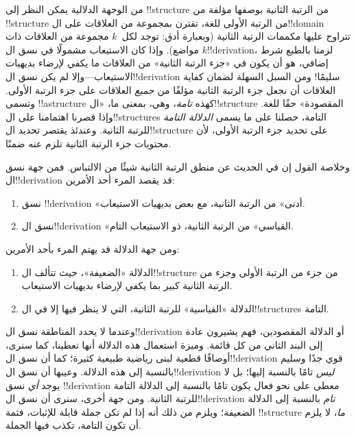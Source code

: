 \documentclass[../../../include/open-logic-section]{subfiles}
\begin{document}
من الوجهة الدلالية يمكن النظر إلى !!{structure} من الرتبة الثانية
بوصفها مؤلفة من !!{structure} من الرتبة الأولى للغة، تقترن بمجموعة من
العلاقات على ال!!{domain} تتراوح عليها مكممات الرتبة الثانية (وبعبارة
  أدق: توجد لكل~$k$ مجموعة من العلاقات ذات $k$ مواضع). وإذا كان
الاستيعاب مشمولًا في نسق ال!!{derivation}، لزمنا بالطبع شرط إضافي، هو
أن يكون في «جزء الرتبة الثانية» من العلاقات ما يكفي لإرضاء بديهيات
الاستيعاب---وإلا لم يكن نسق ال!!{derivation} سليمًا!{} ومن السبل السهلة
لضمان كفاية العلاقات أن نجعل جزء الرتبة الثانية مؤلفًا من
\emph{جميع} العلاقات على جزء الرتبة الأولى. وتسمى !!a{structure} كهذه
\emph{تامة}، وهي، بمعنى ما، «ال!!{structure} المقصودة» حقًا للغة.
وإذا قصرنا اهتمامنا على ال!!{structure}s التامة، حصلنا على ما يسمى
\emph{الدلالة التامة} للرتبة الثانية. وعندئذ يقتصر تحديد
ال!!{structure} على تحديد جزء الرتبة الأولى، لأن محتويات جزء الرتبة
الثانية تلزم عنه ضمنًا.

وخلاصة القول إن في الحديث عن منطق الرتبة الثانية شيئًا من الالتباس.
فمن جهة نسق ال!!{derivation} قد يقصد المرء أحد الأمرين:
\begin{enumerate}
\item نسق !!{derivation} «أدنى» من الرتبة الثانية، مع بعض بديهيات
  الاستيعاب.
\item نسق ال!!{derivation} «القياسي» من الرتبة الثانية، ذو الاستيعاب
  التام.
\end{enumerate}
ومن جهة الدلالة قد يهتم المرء بأحد الأمرين:
\begin{enumerate}
\item الدلالة «الضعيفة»، حيث تتألف ال!!{structure} من جزء من الرتبة
  الأولى وجزء من الرتبة الثانية كبير بما يكفي لإرضاء بديهيات
  الاستيعاب.
\item الدلالة «القياسية» للرتبة الثانية، التي لا ينظر فيها إلا في
  ال!!{structure}s التامة.
\end{enumerate}
وعندما لا يحدد المناطقة نسق ال!!{derivation} أو الدلالة المقصودين، فهم
يشيرون عادة إلى البند الثاني من كل قائمة. وميزة استعمال هذه الدلالة
أنها تعطينا، كما سنرى، أوصافًا قطعية لبنى رياضية طبيعية كثيرة؛ كما أن
نسق ال!!{derivation} قوي جدًا وسليم بالنسبة إلى هذه الدلالة. وعيبها أن
نسق ال!!{derivation} \emph{ليس} تامًا بالنسبة إليها؛ بل لا يوجد
\emph{أي} نسق !!{derivation} معطى على نحو فعال يكون تامًا بالنسبة إلى
الدلالة التامة للرتبة الثانية. ومن جهة أخرى، سنرى أن نسق
ال!!{derivation} \emph{تام} بالنسبة إلى الدلالة الضعيفة؛ ويلزم من ذلك
أنه إذا لم تكن جملة قابلة للإثبات، فثمة !!{structure} \emph{ما}، لا
يلزم أن تكون التامة، تكذب فيها الجملة.
\end{document}

